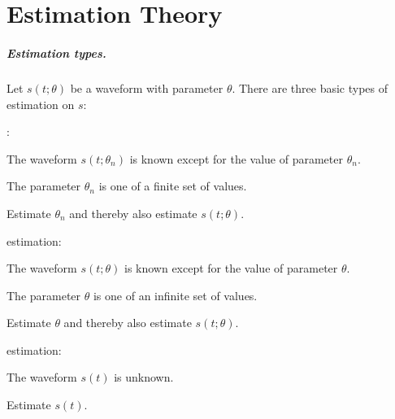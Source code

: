 
\chapter{Estimation Theory }
\label{app:est}
\paragraph{Estimation types.}
Let $s(t;\theta)$ be a waveform with parameter $\theta$.
There are three basic types of estimation on $s$:

\begin{enume}
   \item {}:
      \begin{liste}
         \item The waveform $s(t;\theta_n)$ is known except for the value of parameter $\theta_n$.
         \item The parameter $\theta_n$ is one of a finite set of values.
         \item Estimate $\theta_n$ and thereby also estimate $s(t;\theta)$.
      \end{liste}
   \item {} estimation:
      \begin{liste}
         \item The waveform $s(t;\theta)$ is known except for the value of parameter $\theta$.
         \item The parameter $\theta$ is one of an infinite set of values.
         \item Estimate $\theta$ and thereby also estimate $s(t;\theta)$.
      \end{liste}
   \item {} estimation:
      \begin{liste}
         \item The waveform $s(t)$ is unknown.
         \item Estimate $s(t)$.
      \end{liste}
\end{enume}


